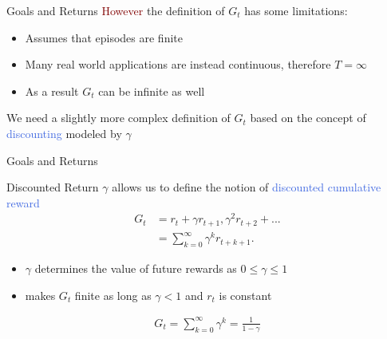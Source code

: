 \documentclass{beamer}
\begin{document}
\begin{frame}{Goals and Returns}
	\textcolor{Maroon}{However} the definition of $G_t$ has some limitations:
	\begin{itemize}
		\item Assumes that episodes are finite 
		\item Many real world applications are instead continuous, therefore $T=\infty$
		\item As a result $G_t$ can be infinite as well
	\end{itemize}

	\bigskip

	We need a slightly more complex definition of $G_t$ based on the concept of \textcolor{RoyalBlue}{discounting} modeled by $\gamma$  

\end{frame}

\begin{frame}{Goals and Returns}
	\begin{block}{Discounted Return}
  	 $\gamma$ allows us to define the notion of \textcolor{RoyalBlue}{discounted cumulative reward}	
		\begin{align*}
			G_t & = r_t+\gamma r_{t+1}, \gamma^{2} r_{t+2} + ... \\
				& = \sum_{k=0}^{\infty}\gamma^{k} r_{t+k+1}.
		\end{align*}

	\end{block}

	\begin{itemize}
		\item $\gamma$ determines the value of future rewards as $0\leq\gamma\leq1$
		\item makes $G_t$ finite as long as $\gamma < 1$ and $r_t$ is constant
	\end{itemize}
	
	\centering
	\begin{align*}
		G_t = \sum_{k=0}^{\infty}\gamma^{k} = \frac{1}{1-\gamma}
	\end{align*}

\end{frame}


\end{document}
